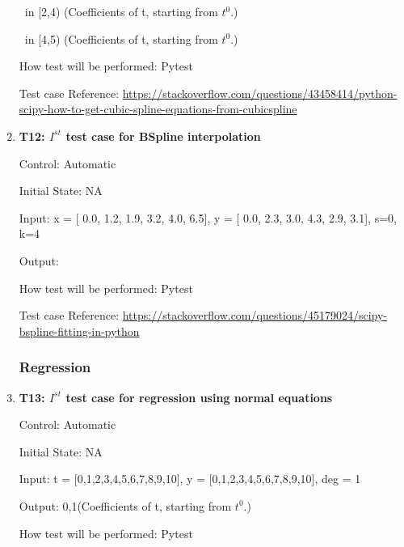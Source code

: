 \documentclass[12pt, titlepage]{article}
\begin{document}
\begin{enumerate}
~\newline [4.0, 4.0, 1.0, 1.0] in [2,4) (Coefficients of t, starting from $t^{0}$.)

~\newline[3.0, 3.61111111, 4.0, 4.0] in [4,5) (Coefficients of t, starting from $t^{0}$.)

How test will be performed: Pytest

Test case Reference: \url{https://stackoverflow.com/questions/43458414/python-scipy-how-to-get-cubic-spline-equations-from-cubicspline}\\


\item{\textbf{T12: $I^{st}$ test case for BSpline interpolation} \\}

Control: Automatic 

Initial State: NA

Input: x = [ 0.0, 1.2,  1.9,  3.2,  4.0,  6.5], y = [ 0.0,  2.3,  3.0,  4.3,  2.9,  3.1], s=0, k=4


Output: 
~\newline [-5.62048630e-18, 2.98780300e+00, -5.74472095e-01,  1.46700914e+01,
-1.03253068e+01,  3.10000000e+00,  0.00000000e+00,  0.00000000e+00,
0.00000000e+00,  0.00000000e+00,  0.00000000e+00]

How test will be performed: Pytest

Test case Reference: \url{https://stackoverflow.com/questions/45179024/scipy-bspline-fitting-in-python}\\



\subsubsection{Regression}



\item{\textbf{T13: $I^{st}$ test case for regression using normal equations} \\}

Control: Automatic

Initial State: NA

Input: t = [0,1,2,3,4,5,6,7,8,9,10], y = [0,1,2,3,4,5,6,7,8,9,10], deg = 1 

Output: 0,1(Coefficients of t, starting from $t^{0}$.)

How test will be performed: Pytest\\


\end{enumerate}
\end{document}

